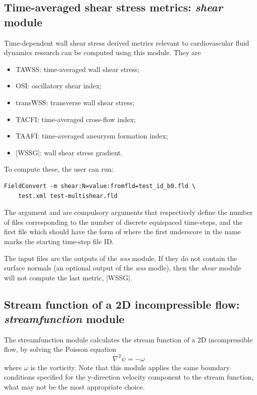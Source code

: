 %
%
%
\subsection{Time-averaged shear stress metrics: \textit{shear} module}
Time-dependent wall shear stress derived metrics relevant to cardiovascular fluid dynamics research can be computed using this module. They are

\begin{itemize}
\item TAWSS: time-averaged wall shear stress;
\item OSI: oscillatory shear index;
\item transWSS: transverse wall shear stress;
\item TACFI: time-averaged cross-flow index;
\item TAAFI: time-averaged aneurysm formation index;
\item |WSSG|: wall shear stress gradient.
\end{itemize}

To compute these, the user can run:
\begin{lstlisting}[style=BashInputStyle]
FieldConvert -m shear:N=value:fromfld=test_id_b0.fld \
    test.xml test-multishear.fld
\end{lstlisting}
The argument  and  are compulsory arguments that respectively define the number of  files corresponding to the number of discrete equispaced time-steps, and the first  file which should have the form of  where the first underscore in the name marks the starting time-step file ID.

The input  files are the outputs of the \textit{wss} module. If they do not contain the surface normals (an optional output of the \textit{wss} modle), then the \textit{shear} module will not compute the last metric, |WSSG|.

%
%
%
\subsection{Stream function of a 2D incompressible flow: \textit{streamfunction} module}

The streamfunction module calculates the stream function of a 2D incompressible flow, by
solving the Poisson equation
\[
\nabla^2 \psi = -\omega
\]
where $\omega$ is the vorticity. Note that this module applies the same boundary conditions
specified for the y-direction velocity component \inltt{v} to the stream function,
what may not be the most appropriate choice.

